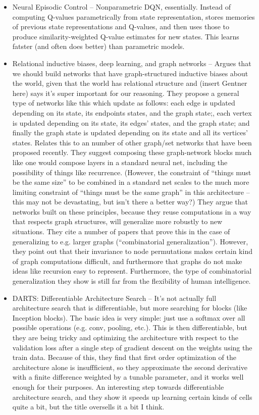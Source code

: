 \documentclass[10pt]{article}
\begin{document}
\begin{itemize}
\item Neural Episodic Control -- Nonparametric DQN, essentially. Instead of computing Q-values parametrically from state representation, stores memories of previous state representations and Q-values, and then uses those to produce similarity-weighted Q-value estimates for new states. This learns fatster (and often does better) than parametric models. \citep{Pritzel2017}
\item Relational inductive biases, deep learning, and graph networks -- Argues that we should build networks that have graph-structured inductive biases about the world, given that the world has relational structure and (insert Gentner here) says it's super important for our reasoning. They propose a general type of networks like this which update as follows: each edge is updated depending on its state, its endpoints states, and the graph state;, each vertex is updated depending on its state, its edges' states, and the graph state; and finally the graph state is updated depending on its state and all its vertices' states. Relates this to an number of other graph/set networks that have been proposed recently. They suggest composing these graph-network blocks much like one would compose layers in a standard neural net, including the possibility of things like recurrence. (However, the constraint of ``things must be the same size'' to be combined in a standard net scales to the much more limiting constraint of ``things must be the same graph'' in this architecture -- this may not be devastating, but isn't there a better way?) They argue that networks built on these principles, because they reuse computations in a way that respects graph structures, will generalize more robustly to new situations. They cite a number of papers that prove this in the case of generalizing to e.g. larger graphs (``combinatorial generalization''). However, they point out that their invariance to node permutations makes certain kind of graph computations difficult, and furthermore that graphs do not make ideas like recursion easy to represent. Furthermore, the type of combinatorial generalization they show is still far from the flexibility of human intelligence.\citep{Battaglia2018} 
\item DARTS: Differentiable Architecture Search -- It's not actually full architecture search that is differentiable, but more searching for blocks (like Inception blocks). The basic idea is very simple: just use a softmax over all possible operations (e.g. conv, pooling, etc.). This is then differentiable, but they are being tricky and optimizing the architecture with respect to the validation loss after a single step of gradient descent on the weights using the train data. Because of this, they find that first order optimization of the architecture alone is insuffficient, so they approximate the second derivative with a finite difference weighted by a tunable parameter, and it works well enough for their purposes. An interesting step towards differentiable architecture search, and they show it speeds up learning certain kinds of cells quite a bit, but the title oversells it a bit I think.  

\end{itemize}
\end{document}
